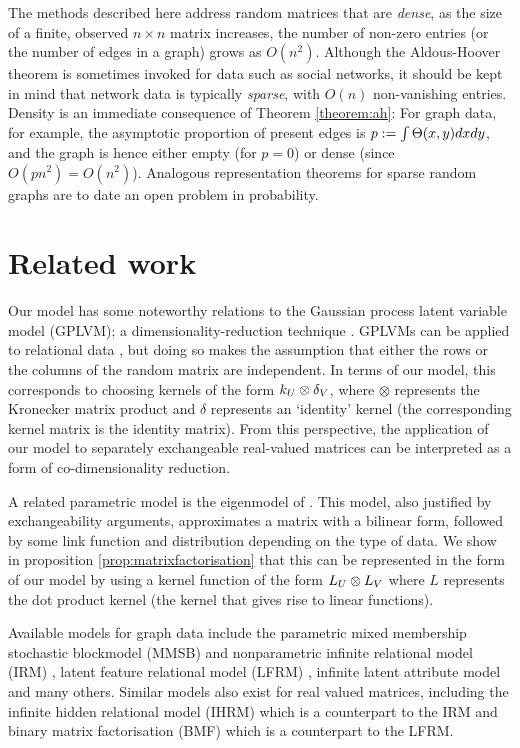 \begin{rem}
  The methods described here address random matrices that are \emph{dense}, \ie as the size of a finite, observed $n\times n$ matrix increases,
  the number of non-zero entries (or the number of edges in a graph) grows as $O(n^2)$. Although the Aldous-Hoover theorem is sometimes invoked
  for data such as social networks, it should be kept in mind that network data is typically \emph{sparse}, with $O(n)$ non-vanishing entries.
  Density is an immediate consequence of Theorem \ref{theorem:ah}: For graph data, for example, the asymptotic proportion of present edges is
  ${p:=\int\Theta(x,y)dxdy}$, and the graph is hence either empty (for $p=0$) or dense (since
  $O(pn^2)=O(n^2)$). Analogous representation theorems for sparse random graphs are to date an open problem in probability.
\end{rem}

\section{Related work}
\label{sec:networks:related}

Our model has some noteworthy relations to the Gaussian process latent variable model (GPLVM); a dimensionality-reduction technique \citep[e.g.][]{Lawrence2005}.
GPLVMs can be applied to relational data \citep{Lawrence2009}, but doing so makes the assumption that either the rows or the columns of the random matrix are independent. 
In terms of our model, this corresponds to choosing kernels of the form $k_U \otimes \delta_V$, where $\otimes$ represents the Kronecker matrix product and $\delta$ represents an `identity' kernel (\ie the corresponding kernel matrix is the identity matrix).
From this perspective, the application of our model to separately exchangeable real-valued matrices can be interpreted as a form of co-dimensionality reduction. 

A related parametric model is the eigenmodel of \citet{Hoff2007a}.
This model, also justified by exchangeability arguments, approximates a matrix with a bilinear form, followed by some link function and distribution depending on the type of data.
We show in proposition \ref{prop:matrixfactorisation} that this can be represented in the form of our model by using a kernel function of the form $L_U \otimes L_V$ where $L$ represents the dot product kernel (\ie the kernel that gives rise to linear functions).

Available models for graph data include the parametric mixed membership stochastic blockmodel (MMSB) \citep{Airoldi2008} and nonparametric infinite relational model (IRM) \cite{Kemp2006}, latent feature relational model (LFRM) \cite{Miller2009}, infinite latent attribute model \cite{Palla2012} and many others.
Similar models also exist for real valued matrices, including the infinite hidden relational model (IHRM) \citep{Xu2006} which is a counterpart to the IRM and binary matrix factorisation (BMF) \citep{Meeds2007} which is a counterpart to the LFRM.

